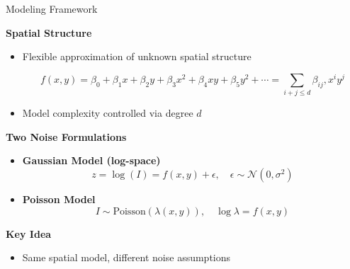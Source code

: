 \documentclass[aspectratio=169]{beamer}
\begin{document}
\begin{frame}{Modeling Framework}

\textbf{Spatial Structure}
\begin{itemize}

\item Flexible approximation of unknown spatial structure

\begin{equation}
    f(x,y) = \beta_0 + \beta_1 x + \beta_2 y + \beta_3 x^2 + \beta_4 xy + \beta_5 y^2 + \cdots  = \sum_{i+j \le d} \beta_{ij}, x^i y^j
\end{equation}

\item Model complexity controlled via degree $d$
\end{itemize}

\break
\vspace{0.1cm}

\textbf{Two Noise Formulations}

\begin{itemize}
\item \textbf{Gaussian Model (log-space)}
\begin{equation}
    z = \log(I) = f(x,y) + \epsilon, \quad \epsilon \sim \mathcal{N}(0,\sigma^2)    
\end{equation}


\break
\item \textbf{Poisson Model}
\begin{equation}
    I \sim \text{Poisson}(\lambda(x,y)), \quad \log \lambda = f(x,y)
\end{equation}


\end{itemize}

\break
\vspace{0.1cm}

\textbf{Key Idea}
\begin{itemize}
\item Same spatial model, different noise assumptions
\end{itemize}

\end{frame}
\end{document}
